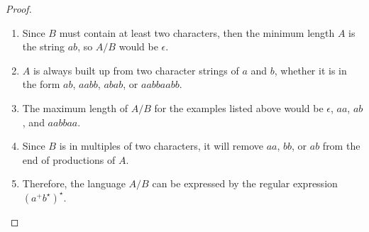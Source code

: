 \documentclass{article}
\begin{document}
\begin{proof}
	\mbox{}
	\begin{enumerate}
	  \item Since $B$ must contain at least two characters, then the minimum
	  length $A$ is the string $ab$, so $A/B$ would be $\epsilon$.
	  \item $A$ is always built up from two character strings of $a$ and $b$,
	  whether it is in the form $ab$, $aabb$, $abab$, or $aabbaabb$. 
	  \item The maximum length of $A/B$ for the examples listed above would be
	  $\epsilon$, $aa$, $ab$, and $aabbaa$.
	  \item Since $B$ is in multiples of two characters, it will remove $aa$, $bb$,
	  or $ab$ from the end of productions of $A$.
	  \item Therefore, the language $A/B$ can be expressed by the regular
	  expression $(a^+ b^\star)^\star$. \qedhere
	\end{enumerate}
\end{proof}
\end{document}
